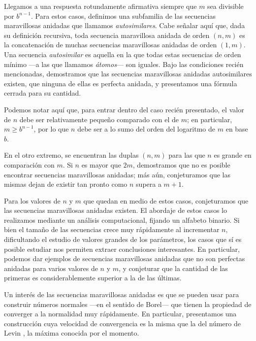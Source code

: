 Llegamos a una respuesta rotundamente afirmativa siempre que $m$ sea
divisible por $b^{n-1}$. Para estos casos, definimos una subfamilia de las
secuencias maravillosas anidadas que llamamos \emph{autosimilares}. Cabe señalar
aquí que, dada su definición recursiva, toda secuencia maravillosa anidada
de orden $(n,m)$ es la concatenación de muchas secuencias maravillosas anidadas
de orden $(1,m)$. Una secuencia \emph{autosimilar} es aquella en la que todas
estas secuencias de orden mínimo ---a las que llamamos \emph{átomos}---
son iguales. Bajo las condiciones recién
mencionadas, demostramos que las secuencias maravillosas anidadas autosimilares
existen, que ninguna de ellas es perfecta anidada, y presentamos una fórmula
cerrada para su cantidad.

Podemos notar aquí que, para entrar dentro del caso recién presentado,
el valor de $n$ debe ser relativamente pequeño comparado con el de $m$;
en particular, $m \geq b^{n-1}$, por lo que $n$ debe ser a lo sumo del orden
del logaritmo de $m$ en base $b$.

En el otro extremo, se encuentran las duplas $(n,m)$ para las que $n$ es grande
en comparación con $m$. Si $n$ es mayor que $2m$, demostramos que no es
posible encontrar secuencias maravillosas anidadas; más aún, conjeturamos que
las mismas dejan de existir tan pronto como $n$ supera a $m + 1$.

Para los valores de $n$ y $m$ que quedan en medio de estos casos,
conjeturamos que las secuencias maravillosas anidadas existen. El abordaje de
estos casos lo realizamos mediante un análisis computacional, fijando un
alfabeto binario. Si bien el tamaño de las secuencias crece muy rápidamente al
incrementar $n$, dificultando el estudio de valores grandes de los parámetros,
los casos que sí es posible estudiar nos permiten extraer conclusiones
interesantes. En particular, podemos dar ejemplos de secuencias maravillosas
anidadas que no son perfectas anidadas para varios valores de $n$ y $m$, y
conjeturar que la cantidad de las primeras es considerablemente superior a la
de las últimas.

Un interés de las secuencias maravillosas anidadas es que se pueden usar
para construir números normales ---en el sentido de Borel--- que 
tienen la propiedad de converger a la normalidad muy rápidamente.
En particular, presentamos una construcción cuya velocidad de convergencia
es la misma que la del número de Levin
\cite[Theorem 2]{levin-discrepancy-estimate}, la máxima conocida por el momento.

